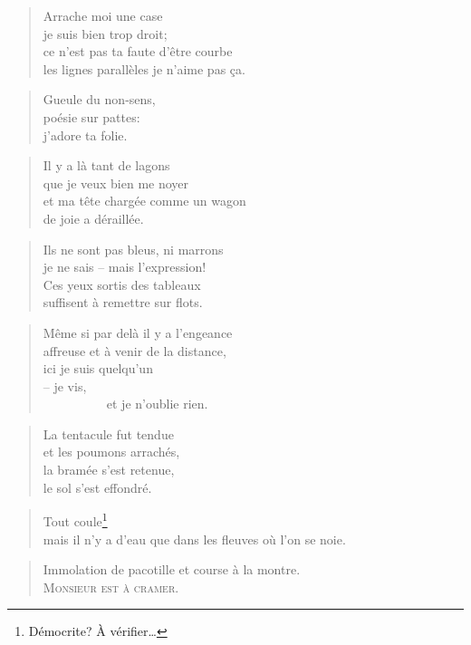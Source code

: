   \begin{verse}
    Arrache moi une case\\
    je suis bien trop droit;\\
    ce n’est pas ta faute d’être courbe\\
    les lignes parallèles je n’aime pas ça.
  \end{verse}
  \begin{verse}
    Gueule du non-sens,\\
    poésie sur pattes:\\
    j’adore ta folie.
  \end{verse}
  \begin{verse}
    Il y a là tant de lagons\\
    que je veux bien me noyer\\
    et ma tête chargée comme un wagon\\
    de joie a déraillée.
  \end{verse}
  \begin{verse}
    Ils ne sont pas bleus, ni marrons\\
    je ne sais -- mais l’expression!\\
    Ces yeux sortis des tableaux\\
    suffisent à remettre sur flots.
  \end{verse}
  \begin{verse}
    Même si par delà il y a l’engeance\\
    affreuse et à venir de la distance,\\
    ici je suis quelqu’un\\
    -- je vis,\\
    ~~~~~~~~~~et je n’oublie rien.
  \end{verse}
  \begin{verse}
    La tentacule fut tendue\\
    et les poumons arrachés,\\
    la bramée s’est retenue,\\
    le sol s’est effondré.
  \end{verse}
  \begin{verse}
    Tout coule\footnote{Démocrite? À vérifier…}\\
    mais il n’y a d’eau que dans les fleuves où l’on se noie.
  \end{verse}
  \begin{verse}
    Immolation de pacotille et course à la montre.\\
    \textsc{Monsieur est à cramer.}
  \end{verse}

